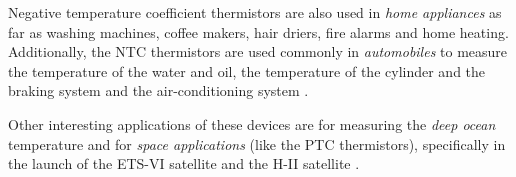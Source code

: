 Negative temperature coefficient thermistors are also used in \textit{home appliances} as far as washing machines, coffee makers, hair driers, fire alarms and home heating. Additionally, the NTC thermistors are used commonly in \textit{automobiles} to measure the temperature of the water and oil, the temperature of the cylinder and the braking system and the air-conditioning system \cite{Feteira2009967}.

Other interesting applications of these devices are for measuring the \textit{deep ocean} temperature \cite{Li2023} and for \textit{space applications} (like the PTC thermistors), specifically in the launch of the ETS-VI satellite and the H-II satellite \cite{Ishikawa1989116}.


